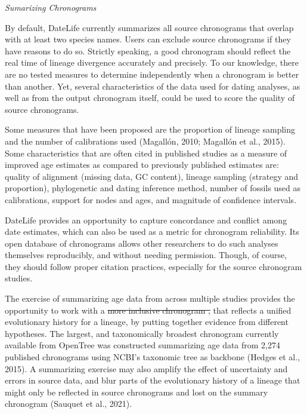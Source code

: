 \documentclass[english,man]{apa6} %
\providecommand{\DIFaddtex}[1]{{\protect\color{blue}\uwave{#1}}} %
\providecommand{\DIFdeltex}[1]{{\protect\color{red}\sout{#1}}}                      %
\providecommand{\DIFaddbegin}{} %
\providecommand{\DIFaddend}{} %
\providecommand{\DIFdelbegin}{} %
\providecommand{\DIFdelend}{} %
\providecommand{\DIFadd}[1]{\texorpdfstring{\DIFaddtex{#1}}{#1}} %
\providecommand{\DIFdel}[1]{\texorpdfstring{\DIFdeltex{#1}}{}} %
\newcommand{\DIFscaledelfig}{0.5}
\newlength{\DIFdelgraphicswidth} %
\newlength{\DIFdelgraphicsheight} %
\newcommand{\DIFaddincludegraphics}[2][]{{\color{blue}\fbox{\DIFOincludegraphics[#1]{#2}}}} %
\newcommand{\DIFdelincludegraphics}[2][]{%
\sbox{\DIFdelgraphicsbox}{\DIFOincludegraphics[#1]{#2}}%
\settoboxwidth{\DIFdelgraphicswidth}{\DIFdelgraphicsbox} %
\settoboxtotalheight{\DIFdelgraphicsheight}{\DIFdelgraphicsbox} %
\scalebox{\DIFscaledelfig}{%
\parbox[b]{\DIFdelgraphicswidth}{\usebox{\DIFdelgraphicsbox}\\[-\baselineskip] \rule{\DIFdelgraphicswidth}{0em}}\llap{\resizebox{\DIFdelgraphicswidth}{\DIFdelgraphicsheight}{%
\setlength{\unitlength}{\DIFdelgraphicswidth}%
\begin{picture}(1,1)%
\thicklines\linethickness{2pt} %
{\color[rgb]{1,0,0}\put(0,0){\framebox(1,1){}}}%
{\color[rgb]{1,0,0}\put(0,0){\line( 1,1){1}}}%
{\color[rgb]{1,0,0}\put(0,1){\line(1,-1){1}}}%
\end{picture}%
}\hspace*{3pt}}} %
} %
\DeclareRobustCommand{\DIFaddbegin}{\DIFOaddbegin \let\includegraphics\DIFaddincludegraphics} %
\DeclareRobustCommand{\DIFaddend}{\DIFOaddend \let\includegraphics\DIFOincludegraphics} %
\DeclareRobustCommand{\DIFdelbegin}{\DIFOdelbegin \let\includegraphics\DIFdelincludegraphics} %
\DeclareRobustCommand{\DIFdelend}{\DIFOaddend \let\includegraphics\DIFOincludegraphics} %
\begin{document}
\DIFaddend \begin{center}
\emph{Sumarizing Chronograms}
\end{center}

By default, DateLife currently summarizes all source chronograms that overlap with at least two species names. Users can exclude source chronograms if they have reasons to do so.
Strictly speaking, a good chronogram should reflect the real time of lineage divergence accurately and precisely.
To our knowledge, there are no tested measures to determine independently when a chronogram is better than another. Yet, several characteristics of the data used for dating analyses, as well as from the output chronogram itself, could be used to score the quality of source chronograms.

Some measures that have been proposed are the proportion of lineage sampling and the number of calibrations used (Magallón, 2010; Magallón et al., 2015).
Some characteristics that are often cited in published studies as a measure of improved age estimates as compared to previously published estimates are: quality of alignment (missing data, GC content), lineage sampling (strategy and proportion), phylogenetic and dating inference method, number of fossils used as calibrations, support for nodes and ages, and magnitude of confidence intervals.

DateLife provides an opportunity to capture concordance and conflict among date estimates, which can also be used as a metric for chronogram reliability.
Its open database of chronograms allows other researchers to do such analyses themselves reproducibly, and without needing permission. Though, of course, they should follow proper citation practices, especially for the source chronogram studies.

The exercise of summarizing age data from across multiple studies provides the opportunity to work with a \DIFdelbegin \DIFdel{more inclusive chronogram ,
}\DIFdelend \DIFaddbegin \DIFadd{chronogram }\DIFaddend that reflects a unified evolutionary history for a lineage, by putting together evidence from different hypotheses.
The largest, and taxonomically broadest chronogram currently available from OpenTree was constructed summarizing age data from 2,274 published chronograms using NCBI's taxonomic tree as backbone (Hedges et al., 2015).
A summarizing exercise may also amplify the effect of uncertainty and errors in source data, and blur parts of the evolutionary history of a lineage that might only be reflected in source chronograms and lost on the summary chronogram (Sauquet et al., 2021).
\end{document}
